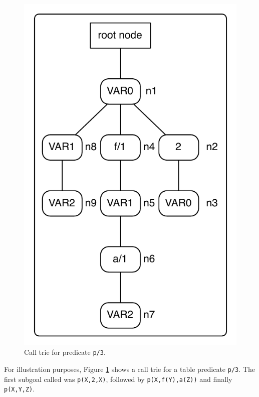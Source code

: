 \begin{figure}[ht]
  \centering
    \includegraphics[scale=0.6]{sub_call_search.pdf}
  \caption{Call trie for predicate \texttt{p/3}.}
  \label{fig:sub_call_search}
\end{figure}

For illustration purposes, Figure \ref{fig:sub_call_search} shows a call trie for a table predicate \texttt{p/3}.
The first subgoal called was \texttt{p(X,2,X)}, followed by \texttt{p(X,f(Y),a(Z))} and finally \texttt{p(X,Y,Z)}.

